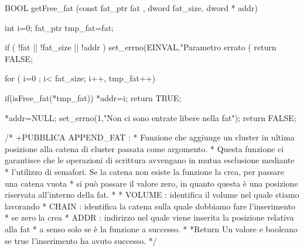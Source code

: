 BOOL  getFree_fat  (const fat_ptr fat , dword fat_size, dword * addr) {
  
    int i=0; 
    fat_ptr tmp_fat=fat; 
    
    
    if ( !fat ||  !fat_size || !addr  ) {
      set_errno(EINVAL,"Parametro errato (%
      return FALSE;
    }
    
    for ( i=0 ; i< fat_size; i++, tmp_fat++) { 
      
	   if(isFree_fat(*tmp_fat)) {
	      *addr=i; 
	      return TRUE; 
	   } 
    }
    
    *addr=NULL; 
    set_errno(1,"Non ci sono entrate libere nella fat"); 
    return FALSE; 
}

/* +PUBBLICA APPEND_FAT :
 * Funzione che aggiunge un cluster in ultima posizione alla catena di cluster passata come argomento. 
 * Questa funzione ci garantisce che le operazioni di scrittura avvengano in mutua esclusione mediante 
 * l'utilizzo di semafori. Se la catena non esiste la funzione la crea, per passare una catena vuota 
 * si può passare il valore zero, in quanto questa è una posizione riservata all'interno della fat. 
 * 
 * VOLUME : identifica il volume nel quale stiamo lavorando 
 * CHAIN  : identifica la catena sulla quale dobbiamo fare l'inserimento 
 *	    se zero la crea  
 * ADDR   : indirizzo nel quale viene inserita la posizione relativa alla fat 
 *	    a senso solo se è la funzione a successo.
 *
 *Return Un valore e booleano se true l'inserimento ha avuto successo.
 */ 

